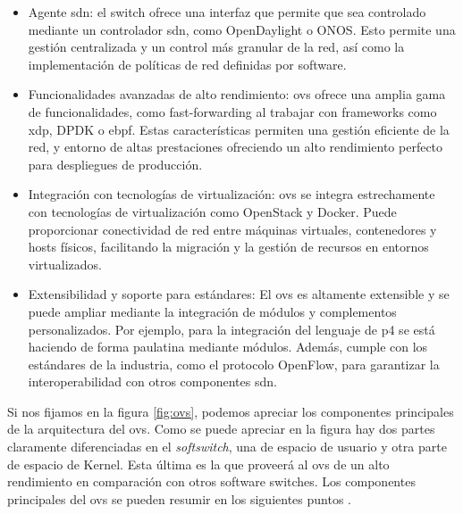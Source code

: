 \begin{itemize}
    \item Agente \gls{sdn}: el switch ofrece una interfaz que permite que sea controlado mediante un controlador \gls{sdn}, como OpenDaylight o ONOS. Esto permite una gestión centralizada y un control más granular de la red, así como la implementación de políticas de red definidas por software.
    \item Funcionalidades avanzadas de alto rendimiento: \gls{ovs} ofrece una amplia gama de funcionalidades, como fast-forwarding al trabajar con frameworks como \gls{xdp}, DPDK o \gls{ebpf}. Estas características permiten una gestión eficiente de la red, y entorno de altas prestaciones ofreciendo un alto rendimiento perfecto para despliegues de producción.
    \item Integración con tecnologías de virtualización: \gls{ovs} se integra estrechamente con tecnologías de virtualización como OpenStack y Docker. Puede proporcionar conectividad de red entre máquinas virtuales, contenedores y hosts físicos, facilitando la migración y la gestión de recursos en entornos virtualizados.
    \item Extensibilidad y soporte para estándares: El \gls{ovs} es altamente extensible y se puede ampliar mediante la integración de módulos y complementos personalizados. Por ejemplo, para la integración del lenguaje de \gls{p4} se está haciendo de forma paulatina mediante módulos. Además, cumple con los estándares de la industria, como el protocolo OpenFlow, para garantizar la interoperabilidad con otros componentes \gls{sdn}.
\end{itemize}

Si nos fijamos en la figura \ref{fig:ovs}, podemos apreciar los componentes principales de la arquitectura del \gls{ovs}. Como se puede apreciar en la figura hay dos partes claramente diferenciadas en el \textit{softswitch}, una de espacio de usuario y otra parte de espacio de Kernel. Esta última es la que proveerá al \gls{ovs} de un alto rendimiento en comparación con otros software switches.  Los componentes principales del \gls{ovs} se pueden resumir en los siguientes puntos \cite{ovs1}.

